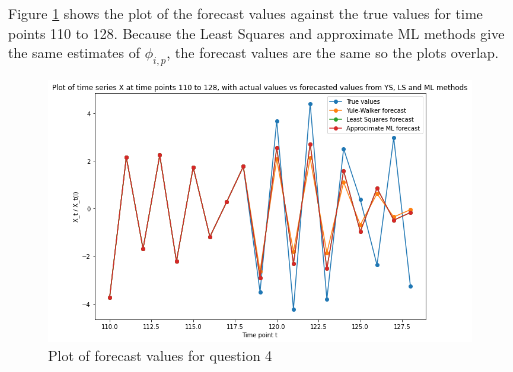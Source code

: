 \documentclass[a4paper,10pt]{article}
\theoremstyle{mytheor}
\begin{document}
Figure \ref{plot4} shows the plot of the forecast values against the true values for time points 110 to 128. Because the Least Squares and approximate ML methods give the same estimates of $\phi_{i,p}$, the forecast values are the same so the plots overlap.

\begin{figure}
    \centering
    \includegraphics[width = 0.9\columnwidth]{plot4.png}
    \caption{Plot of forecast values for question 4}
    \label{plot4}
\end{figure}
\end{document}
